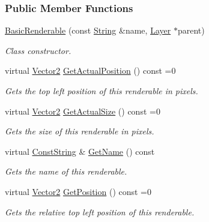 \subsubsection*{Public Member Functions}
\begin{DoxyCompactItemize}
\item 
\hyperlink{classMezzanine_1_1UI_1_1BasicRenderable_aace539a4a4bd0795543f152fd0f3d86c}{BasicRenderable} (const \hyperlink{namespaceMezzanine_acf9fcc130e6ebf08e3d8491aebcf1c86}{String} \&name, \hyperlink{classMezzanine_1_1UI_1_1Layer}{Layer} $\ast$parent)
\begin{DoxyCompactList}\small\item\em Class constructor. \item\end{DoxyCompactList}\item 
virtual \hyperlink{classMezzanine_1_1Vector2}{Vector2} \hyperlink{classMezzanine_1_1UI_1_1BasicRenderable_a7469e579a834b00bd90a87fd754d14af}{GetActualPosition} () const =0
\begin{DoxyCompactList}\small\item\em Gets the top left position of this renderable in pixels. \item\end{DoxyCompactList}\item 
virtual \hyperlink{classMezzanine_1_1Vector2}{Vector2} \hyperlink{classMezzanine_1_1UI_1_1BasicRenderable_a14b2ff20cdf114c34cc23074d0b7fb5c}{GetActualSize} () const =0
\begin{DoxyCompactList}\small\item\em Gets the size of this renderable in pixels. \item\end{DoxyCompactList}\item 
virtual \hyperlink{namespaceMezzanine_a63cd699ac54b73953f35ec9cfc05e506}{ConstString} \& \hyperlink{classMezzanine_1_1UI_1_1BasicRenderable_a1d3be8e827a562ade939383b4633ddb3}{GetName} () const 
\begin{DoxyCompactList}\small\item\em Gets the name of this renderable. \item\end{DoxyCompactList}\item 
virtual \hyperlink{classMezzanine_1_1Vector2}{Vector2} \hyperlink{classMezzanine_1_1UI_1_1BasicRenderable_ab6aa1fb10dc7e9e412e7caac9133c9a6}{GetPosition} () const =0
\begin{DoxyCompactList}\small\item\em Gets the relative top left position of this renderable. \item\end{DoxyCompactList}\item 

\end{DoxyCompactItemize}
